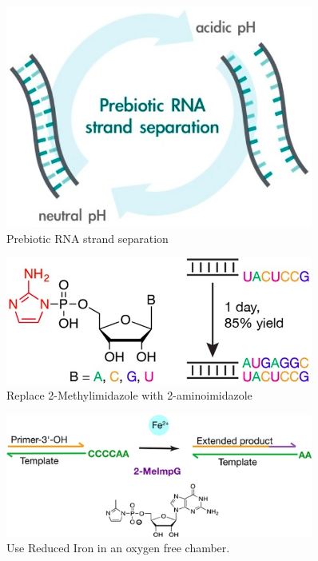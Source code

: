 \documentclass[]{article}
\begin{document}
\begin{figure}[H]
	\caption{Prebiotic RNA strand separation}\label{fig:PrebioticRNA_StrandSeparation}
	\includegraphics[width=0.9\textwidth]{PrebioticRNA_StrandSeparation}
\end{figure}

\begin{figure}[H]
	\caption{Replace 2-Methylimidazole with 2-aminoimidazole}\label{fig:ChangeLeavingGroup}
	\includegraphics[width=0.9\textwidth]{ChangeLeavingGroup}
\end{figure}

\begin{figure}[H]
	\caption{Use Reduced Iron in an oxygen free chamber.}\label{fig:RNA_polymerization_via_iron}
	\includegraphics[width=0.9\textwidth]{RNA_polymerization_via_iron}
\end{figure}
\end{document}
